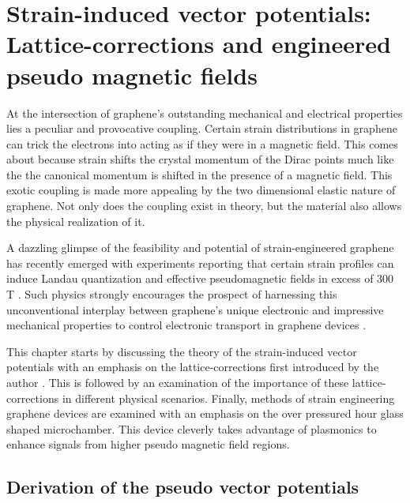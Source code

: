\chapter{Strain-induced vector potentials: Lattice-corrections and engineered pseudo magnetic fields\label{chap:PVP}}

At the intersection of graphene's outstanding mechanical and electrical properties lies a peculiar and provocative coupling.
Certain strain distributions in graphene can trick the electrons into acting as if they were in a magnetic field.
This comes about because strain shifts the crystal momentum of the Dirac points much like the the canonical momentum is shifted in the presence of a magnetic field.
This exotic coupling is made more appealing by the two dimensional elastic nature of graphene.
Not only does the coupling exist in theory, but the material also allows the physical realization of it.

A dazzling glimpse of the feasibility and potential of strain-engineered graphene \cite{Pereira2009a,Guinea2009} has recently emerged with experiments reporting that certain strain profiles can induce Landau quantization and effective pseudomagnetic fields in excess of 300 T \cite{Levy2010,Yan2012,Yeh2011}.
Such physics strongly encourages the prospect of harnessing this unconventional interplay between graphene's unique electronic and impressive mechanical properties to control electronic transport in graphene devices \cite{Pereira2009a,Fogler2008}.

This chapter starts by discussing the theory of the strain-induced vector potentials with an emphasis on the lattice-corrections first introduced by the author \cite{Kitt2012,Kitt2013}.
This is followed by an examination of the importance of these lattice-corrections in different physical scenarios.
Finally, methods of strain engineering graphene devices are examined with an emphasis on the over pressured hour glass shaped microchamber.
This device cleverly takes advantage of plasmonics to enhance signals from higher pseudo magnetic field regions.

\section{Derivation of the pseudo vector potentials}

